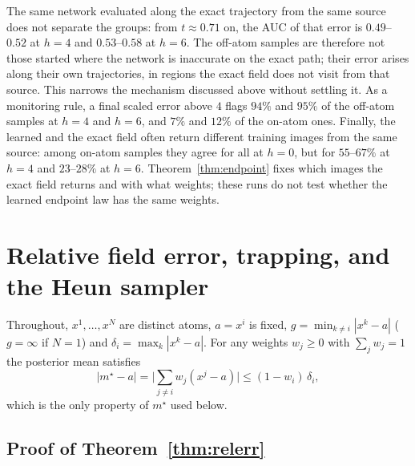\documentclass{article} %
\theoremstyle{plain}
\theoremstyle{definition}
\theoremstyle{remark}
\begin{document}
The same network evaluated along the exact trajectory from the same source does not separate the
groups: from $t\approx0.71$ on, the AUC of that error is $0.49$--$0.52$ at $h=4$ and
$0.53$--$0.58$ at $h=6$. The off-atom samples are therefore not those started where the network
is inaccurate on the exact path; their error arises along their own trajectories, in regions the
exact field does not visit from that source. This narrows the mechanism discussed above without
settling it. As a monitoring rule, a final scaled error above $4$ flags $94\%$ and $95\%$ of the
off-atom samples at $h=4$ and $h=6$, and $7\%$ and $12\%$ of the on-atom ones. Finally, the
learned and the exact field often return different training images from the same source: among
on-atom samples they agree for all at $h=0$, but for $55$--$67\%$ at $h=4$ and $23$--$28\%$ at
$h=6$. Theorem~\ref{thm:endpoint} fixes which images the exact field returns and with what
weights; these runs do not test whether the learned endpoint law has the same weights.

\section{Relative field error, trapping, and the Heun sampler}
\label{app:relerr}

Throughout, $x^1,\dots,x^N$ are distinct atoms, $a=x^i$ is fixed,
$g=\min_{k\ne i}|x^k-a|$ ($g=\infty$ if $N=1$) and $\delta_i=\max_k|x^k-a|$. For any weights
$w_j\ge0$ with $\sum_jw_j=1$ the posterior mean satisfies
\begin{equation}
|m^\star-a|=\Big|\sum_{j\ne i}w_j(x^j-a)\Big|\le(1-w_i)\,\delta_i,
\label{eq:offmass}
\end{equation}
which is the only property of $m^\star$ used below.

\subsection{Proof of Theorem~\ref{thm:relerr}}
\label{apx:pf-relerr}

\thmrelerr*
\end{document}
